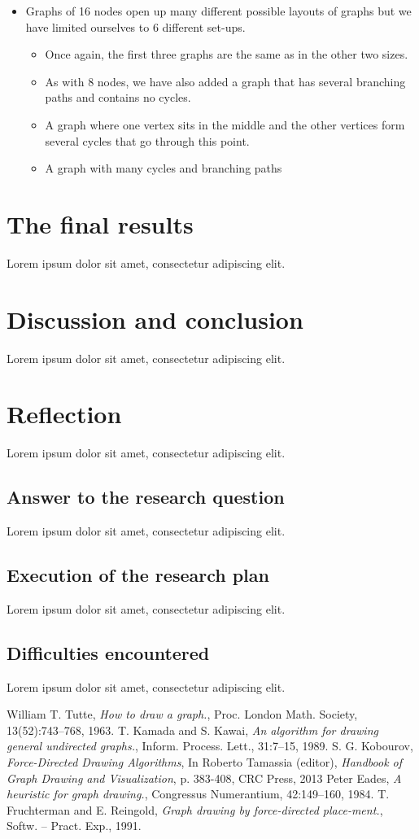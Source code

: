 \documentclass[a4paper,12pt,twoside]{article}
\begin{document}
\begin{itemize}
\item Graphs of 16 nodes open up many different possible layouts of graphs but we have limited ourselves to 6 different set-ups.
\begin{itemize}
\item Once again, the first three graphs are the same as in the other two sizes.
\item As with 8 nodes, we have also added a graph that has several branching paths and contains no cycles.
\item A graph where one vertex sits in the middle and the other vertices form several cycles that go through this point.
\item A graph with many cycles and branching paths
\end{itemize}
\end{itemize}

\section{The final results}\label{s:results}
Lorem ipsum dolor sit amet, consectetur adipiscing elit.

\section{Discussion and conclusion}
Lorem ipsum dolor sit amet, consectetur adipiscing elit.

\section{Reflection}
Lorem ipsum dolor sit amet, consectetur adipiscing elit.
\subsection{Answer to the research question}
Lorem ipsum dolor sit amet, consectetur adipiscing elit.
\subsection{Execution of the research plan}
Lorem ipsum dolor sit amet, consectetur adipiscing elit.\subsection{Difficulties encountered}
Lorem ipsum dolor sit amet, consectetur adipiscing elit.

\begin{thebibliography}{99}
William T. Tutte, \emph{How to draw a graph.}, Proc. London Math. Society, 13(52):743–768, 1963.
T. Kamada and S. Kawai, \emph{An algorithm for drawing general undirected graphs.}, Inform. Process. Lett., 31:7–15, 1989.
S. G. Kobourov, \emph{Force-Directed Drawing Algorithms}, In Roberto Tamassia (editor), \emph{Handbook of Graph Drawing and Visualization}, p. 383-408, CRC Press, 2013
 Peter Eades, \emph{A heuristic for graph drawing.}, Congressus Numerantium, 42:149–160, 1984.
T. Fruchterman and E. Reingold, \emph{Graph drawing by force-directed place-ment.}, Softw. – Pract. Exp., 1991.
\end{thebibliography}
\end{document}
